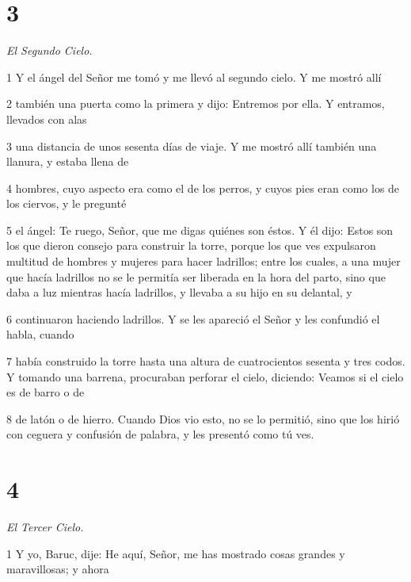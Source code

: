 \chapter{3}

\par \textit{El Segundo Cielo.}

\par 1 Y el ángel del Señor me tomó y me llevó al segundo cielo. Y me mostró allí

\par 2 también una puerta como la primera y dijo: Entremos por ella. Y entramos, llevados con alas

\par 3 una distancia de unos sesenta días de viaje. Y me mostró allí también una llanura, y estaba llena de

\par 4 hombres, cuyo aspecto era como el de los perros, y cuyos pies eran como los de los ciervos, y le pregunté

\par 5 el ángel: Te ruego, Señor, que me digas quiénes son éstos. Y él dijo: Estos son los que dieron consejo para construir la torre, porque los que ves expulsaron multitud de hombres y mujeres para hacer ladrillos; entre los cuales, a una mujer que hacía ladrillos no se le permitía ser liberada en la hora del parto, sino que daba a luz mientras hacía ladrillos, y llevaba a su hijo en su delantal, y

\par 6 continuaron haciendo ladrillos. Y se les apareció el Señor y les confundió el habla, cuando

\par 7 había construido la torre hasta una altura de cuatrocientos sesenta y tres codos. Y tomando una barrena, procuraban perforar el cielo, diciendo: Veamos si el cielo es de barro o de

\par 8 de latón o de hierro. Cuando Dios vio esto, no se lo permitió, sino que los hirió con ceguera y confusión de palabra, y les presentó como tú ves.

\chapter{4}

\par \textit{El Tercer Cielo.}

\par 1 Y yo, Baruc, dije: He aquí, Señor, me has mostrado cosas grandes y maravillosas; y ahora

